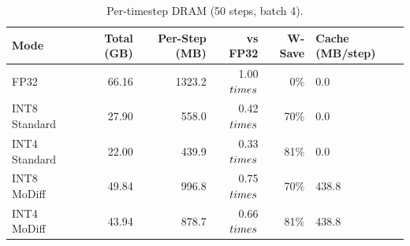 \begin{table}[t]
\centering
\caption{Per-timestep DRAM (50 steps, batch 4).}
\label{tab:memory_per_step}
\begin{tabular}{lrrrrl}
\toprule
Mode & Total (GB) & Per-Step (MB) & vs FP32 & W-Save & Cache (MB/step) \\
\midrule
  FP32 & 66.16 & 1323.2 & 1.00$\\times$ & 0\% & 0.0 \\
  INT8 Standard & 27.90 & 558.0 & 0.42$\\times$ & 70\% & 0.0 \\
  INT4 Standard & 22.00 & 439.9 & 0.33$\\times$ & 81\% & 0.0 \\
  INT8 MoDiff & 49.84 & 996.8 & 0.75$\\times$ & 70\% & 438.8 \\
  INT4 MoDiff & 43.94 & 878.7 & 0.66$\\times$ & 81\% & 438.8 \\
\bottomrule
\end{tabular}
\end{table}

